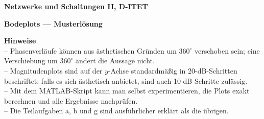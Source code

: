 \documentclass[a4paper,12pt]{article}
\begin{document}
\begin{titlepage}
\thispagestyle{firstpage}
\vspace*{4cm}
\begin{center}
{\Large\bfseries Netzwerke und Schaltungen II, D-ITET\par}
\vspace{3mm}
{\Huge\bfseries Bodeplots — Musterlösung\par}
\vspace{9mm}
\end{center}
\vfill
\begingroup\footnotesize
\textbf{Hinweise}\\[2pt]
– Phasenverläufe können aus ästhetischen Gründen um $360^\circ$ verschoben sein; eine Verschiebung um $360^\circ$ ändert die Aussage nicht.\\
– Magnitudenplots sind auf der $y$-Achse standardmäßig in 20-dB-Schritten beschriftet; falls es sich ästhetisch anbietet, sind auch 10-dB-Schritte zulässig.\\
– Mit dem MATLAB-Skript kann man selbst experimentieren, die Plots exakt berechnen und alle Ergebnisse nachprüfen.\\
– Die Teilaufgaben a, b und g sind ausführlicher erklärt als die übrigen.
\endgroup
\vfill
\end{titlepage}








 













\end{document}
